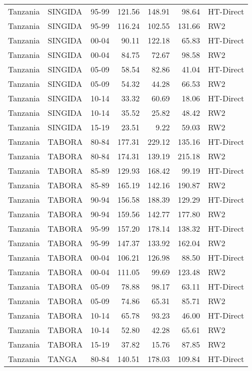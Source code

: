 \begin{longtable}{lllrrrl}
  Tanzania & SINGIDA & 95-99 & 121.56 & 148.91 & 98.64 & HT-Direct \\ 
  Tanzania & SINGIDA & 95-99 & 116.24 & 102.55 & 131.66 & RW2 \\ 
  Tanzania & SINGIDA & 00-04 & 90.11 & 122.18 & 65.83 & HT-Direct \\ 
  Tanzania & SINGIDA & 00-04 & 84.75 & 72.67 & 98.58 & RW2 \\ 
  Tanzania & SINGIDA & 05-09 & 58.54 & 82.86 & 41.04 & HT-Direct \\ 
  Tanzania & SINGIDA & 05-09 & 54.32 & 44.28 & 66.53 & RW2 \\ 
  Tanzania & SINGIDA & 10-14 & 33.32 & 60.69 & 18.06 & HT-Direct \\ 
  Tanzania & SINGIDA & 10-14 & 35.52 & 25.82 & 48.42 & RW2 \\ 
  Tanzania & SINGIDA & 15-19 & 23.51 & 9.22 & 59.03 & RW2 \\ 
  Tanzania & TABORA & 80-84 & 177.31 & 229.12 & 135.16 & HT-Direct \\ 
  Tanzania & TABORA & 80-84 & 174.31 & 139.19 & 215.18 & RW2 \\ 
  Tanzania & TABORA & 85-89 & 129.93 & 168.42 & 99.19 & HT-Direct \\ 
  Tanzania & TABORA & 85-89 & 165.19 & 142.16 & 190.87 & RW2 \\ 
  Tanzania & TABORA & 90-94 & 156.58 & 188.39 & 129.29 & HT-Direct \\ 
  Tanzania & TABORA & 90-94 & 159.56 & 142.77 & 177.80 & RW2 \\ 
  Tanzania & TABORA & 95-99 & 157.20 & 178.14 & 138.32 & HT-Direct \\ 
  Tanzania & TABORA & 95-99 & 147.37 & 133.92 & 162.04 & RW2 \\ 
  Tanzania & TABORA & 00-04 & 106.21 & 126.98 & 88.50 & HT-Direct \\ 
  Tanzania & TABORA & 00-04 & 111.05 & 99.69 & 123.48 & RW2 \\ 
  Tanzania & TABORA & 05-09 & 78.88 & 98.17 & 63.11 & HT-Direct \\ 
  Tanzania & TABORA & 05-09 & 74.86 & 65.31 & 85.71 & RW2 \\ 
  Tanzania & TABORA & 10-14 & 65.78 & 93.23 & 46.00 & HT-Direct \\ 
  Tanzania & TABORA & 10-14 & 52.80 & 42.28 & 65.61 & RW2 \\ 
  Tanzania & TABORA & 15-19 & 37.82 & 15.76 & 87.85 & RW2 \\ 
  Tanzania & TANGA & 80-84 & 140.51 & 178.03 & 109.84 & HT-Direct \\ 

\end{longtable}
